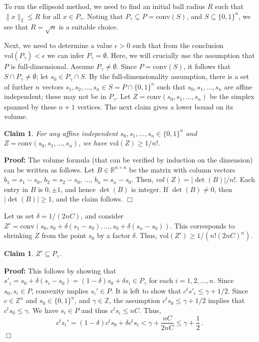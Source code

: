 \documentclass[12pt, showidx, twoside]{article}
\newtheorem{claim}[satz]{Claim}
\def\prove{\par \noindent \hbox{\bf Proof:}\quad}
\def\endproof{\hfill{$\Box$}}
\def\R{\mathbb{R}}
\newcommand{\vol}{\text{vol}}
\begin{document}
{{{To run the ellipsoid method, we need to find an initial ball radius $R$ such that $\|x\|_2\le R$ for all $x\in P_{\gamma}$. Noting that $P_{\gamma}\subseteq P=\mathrm{conv}(S)$, and $S\subseteq\{0,1\}^n$, we see that $R=\sqrt{n}$ is a suitable choice.

Next, we need to determine a value $\epsilon>0$ such that from the conclusion $\vol(P_{\gamma})<\epsilon$ we can infer $P_{\gamma}=\emptyset$. Here, we will crucially use the assumption that $P$ is full-dimensional. Assume $P_{\gamma}\neq\emptyset$. Since $P=\mathrm{conv}(S)$, it follows that $S\cap P_{\gamma}\neq\emptyset$; let $s_0\in P_{\gamma}\cap S$. By the full-dimensionality assumption, there is a set of further $n$ vectors $s_1,s_2,\ldots,s_n\in S=P\cap\{0,1\}^n$ such that $s_0,s_1,\ldots,s_n$ are affine independent; these may not be in $P_{\gamma}$. Let $Z=\mathrm{conv}(s_0,s_1,\ldots,s_n)$ be the simplex spanned by these $n+1$ vertices. The next claim gives a lower bound on its volume.

\begin{claim} For any affine independent $s_0,s_1,\ldots,s_n\in\{0,1\}^n$ and $Z=\mathrm{conv}(s_0,s_1,\ldots,s_n)$, we have $\vol(Z)\ge 1/n!$.
\end{claim}
\prove
The volume formula (that can be verified by induction on the dimension) can be written as follows. Let $B\in\R^{n\times n}$ be the matrix with column vectors  $b_1=s_1-s_0$, $b_2=s_2-s_0$, $\ldots$, $b_n=s_n-s_0$. Then, $vol(Z)=|\det(B)|/n!$. Each entry in $B$ is $0,\pm 1$, and hence $\det(B)$ is integer. If $\det(B)\neq 0$, then $|\det(B)|\ge 1$, and the claim follows.
\endproof

Let us set $\delta=1/(2nC)$, and consider $Z'=\mathrm{conv}(s_0,s_0+\delta(s_1-s_0),\ldots,s_0+\delta(s_n-s_0))$. This corresponds to shrinking $Z$ from the point $s_0$ by a factor $\delta$. Thus, $\vol(Z')\ge 1/(n! (2nC)^n)$. 

\begin{claim} $Z'\subseteq P_{\gamma}$.
\end{claim}
\prove
This follows by showing that $s'_i=s_0+\delta(s_i-s_0)=(1-\delta)s_0+\delta s_i\in P_{\gamma}$ for each $i=1,2,\ldots,n$. Since $s_0,s_i\in P$, convexity implies $s_i'\in P$. It is left to show that $c^t s'_i\le \gamma+1/2$. Since $c\in\mathbb{Z}^n$ and $s_0\in \{0,1\}^n$, and $\gamma\in\mathbb{Z}$, the assumption $c^t s_0\le \gamma+1/2$ implies that $c^t s_0\le \gamma$. We have $s_i\in P$ and thus $c^t s_i\le nC$. Thus, 
\[
    c^t s_i'=(1-\delta) c^t s_0+\delta c^t s_i< \gamma+\frac{nC}{2nC}\le \gamma+\frac{1}{2}\, .
\]\endproof

}}}
\end{document}
